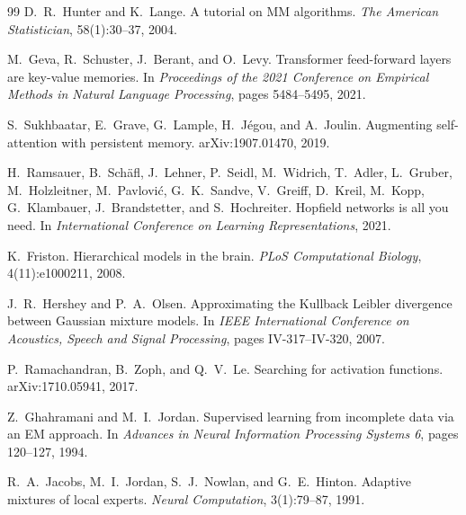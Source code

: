 \documentclass[11pt]{article}
\theoremstyle{definition}
\theoremstyle{remark}
\begin{document}
\begin{thebibliography}{99}
D.~R.~Hunter and K.~Lange.
\newblock A tutorial on {MM} algorithms.
\newblock \emph{The American Statistician}, 58(1):30--37, 2004.

M.~Geva, R.~Schuster, J.~Berant, and O.~Levy.
\newblock Transformer feed-forward layers are key-value memories.
\newblock In \emph{Proceedings of the 2021 Conference on Empirical Methods in Natural Language Processing}, pages 5484--5495, 2021.

S.~Sukhbaatar, E.~Grave, G.~Lample, H.~J{\'e}gou, and A.~Joulin.
\newblock Augmenting self-attention with persistent memory.
\newblock arXiv:1907.01470, 2019.

H.~Ramsauer, B.~Sch{\"a}fl, J.~Lehner, P.~Seidl, M.~Widrich, T.~Adler, L.~Gruber, M.~Holzleitner, M.~Pavlovi{\'c}, G.~K.~Sandve, V.~Greiff, D.~Kreil, M.~Kopp, G.~Klambauer, J.~Brandstetter, and S.~Hochreiter.
\newblock Hopfield networks is all you need.
\newblock In \emph{International Conference on Learning Representations}, 2021.

K.~Friston.
\newblock Hierarchical models in the brain.
\newblock \emph{PLoS Computational Biology}, 4(11):e1000211, 2008.

J.~R.~Hershey and P.~A.~Olsen.
\newblock Approximating the {K}ullback {L}eibler divergence between {G}aussian mixture models.
\newblock In \emph{IEEE International Conference on Acoustics, Speech and Signal Processing}, pages IV-317--IV-320, 2007.

P.~Ramachandran, B.~Zoph, and Q.~V.~Le.
\newblock Searching for activation functions.
\newblock arXiv:1710.05941, 2017.

Z.~Ghahramani and M.~I.~Jordan.
\newblock Supervised learning from incomplete data via an {EM} approach.
\newblock In \emph{Advances in Neural Information Processing Systems 6}, pages 120--127, 1994.

R.~A.~Jacobs, M.~I.~Jordan, S.~J.~Nowlan, and G.~E.~Hinton.
\newblock Adaptive mixtures of local experts.
\newblock \emph{Neural Computation}, 3(1):79--87, 1991.


\end{thebibliography}
\end{document}
